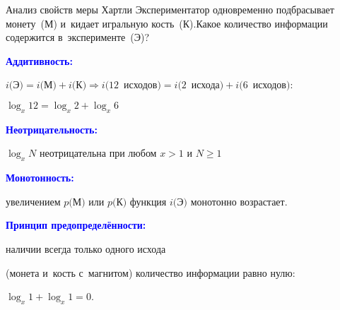\documentclass[aspectratio=169]{beamer}
\begin{document}
\begin{frame}{Анализ свойств меры Хартли}
	Экспериментатор одновременно подбрасывает монету~(М) и~кидает игральную кость~(К).Какое количество информации содержится в~эксперименте~(Э)?

	\vspace{0.5cm}

	\textbf{\textcolor{blue}{Аддитивность:}}

		\quad$i($Э$) = i($М$) + i($К$) \Rightarrow i(12$~исходов$) = i (2$~исхода$) + i (6$~исходов$): $

		\quad$\log_x 12=\log_x 2+\log_x 6$

	\vspace{0.3cm}

	\textbf{\textcolor{blue}{Неотрицательность:}}

		 $\log_x N$ неотрицательна при любом $x > 1$ и $N \ge 1$

	\vspace{0.3cm}

	\textbf{\textcolor{blue}{Монотонность:}}

		 увеличением $p($М$)$ или $p($К$)$ функция $i($Э$)$ монотонно возрастает.

	\vspace{0.3cm}

	\textbf{\textcolor{blue}{Принцип предопределённости:}}

		 наличии всегда только одного исхода 

		\quad(монета и~кость с~магнитом) количество информации равно нулю:

		\quad$\log_x 1 + \log_x 1 = 0$. 
\end{frame}
\end{document}
